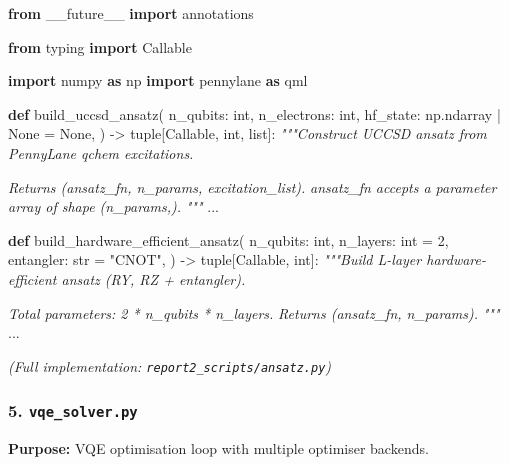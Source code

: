 \documentclass[
  11pt,
]{report}
\newenvironment{Shaded}{}{}
\newcommand{\BuiltInTok}[1]{\textcolor[rgb]{0.00,0.50,0.00}{#1}}
\newcommand{\CommentTok}[1]{\textcolor[rgb]{0.38,0.63,0.69}{\textit{#1}}}
\newcommand{\DecValTok}[1]{\textcolor[rgb]{0.25,0.63,0.44}{#1}}
\newcommand{\ImportTok}[1]{\textcolor[rgb]{0.00,0.50,0.00}{\textbf{#1}}}
\newcommand{\KeywordTok}[1]{\textcolor[rgb]{0.00,0.44,0.13}{\textbf{#1}}}
\newcommand{\NormalTok}[1]{#1}
\newcommand{\OperatorTok}[1]{\textcolor[rgb]{0.40,0.40,0.40}{#1}}
\newcommand{\StringTok}[1]{\textcolor[rgb]{0.25,0.44,0.63}{#1}}
\newcommand{\VariableTok}[1]{\textcolor[rgb]{0.10,0.09,0.49}{#1}}
\begin{document}
\begin{Shaded}
\begin{Highlighting}[]
\ImportTok{from}\NormalTok{ \_\_future\_\_ }\ImportTok{import}\NormalTok{ annotations}

\ImportTok{from}\NormalTok{ typing }\ImportTok{import}\NormalTok{ Callable}

\ImportTok{import}\NormalTok{ numpy }\ImportTok{as}\NormalTok{ np}
\ImportTok{import}\NormalTok{ pennylane }\ImportTok{as}\NormalTok{ qml}


\KeywordTok{def}\NormalTok{ build\_uccsd\_ansatz(}
\NormalTok{    n\_qubits: }\BuiltInTok{int}\NormalTok{,}
\NormalTok{    n\_electrons: }\BuiltInTok{int}\NormalTok{,}
\NormalTok{    hf\_state: np.ndarray }\OperatorTok{|} \VariableTok{None} \OperatorTok{=} \VariableTok{None}\NormalTok{,}
\NormalTok{) }\OperatorTok{{-}\textgreater{}} \BuiltInTok{tuple}\NormalTok{[Callable, }\BuiltInTok{int}\NormalTok{, }\BuiltInTok{list}\NormalTok{]:}
    \CommentTok{"""Construct UCCSD ansatz from PennyLane qchem excitations.}

\CommentTok{    Returns (ansatz\_fn, n\_params, excitation\_list).}
\CommentTok{    ansatz\_fn accepts a parameter array of shape (n\_params,).}
\CommentTok{    """}
\NormalTok{    ...}


\KeywordTok{def}\NormalTok{ build\_hardware\_efficient\_ansatz(}
\NormalTok{    n\_qubits: }\BuiltInTok{int}\NormalTok{,}
\NormalTok{    n\_layers: }\BuiltInTok{int} \OperatorTok{=} \DecValTok{2}\NormalTok{,}
\NormalTok{    entangler: }\BuiltInTok{str} \OperatorTok{=} \StringTok{"CNOT"}\NormalTok{,}
\NormalTok{) }\OperatorTok{{-}\textgreater{}} \BuiltInTok{tuple}\NormalTok{[Callable, }\BuiltInTok{int}\NormalTok{]:}
    \CommentTok{"""Build L{-}layer hardware{-}efficient ansatz (RY, RZ + entangler).}

\CommentTok{    Total parameters: 2 * n\_qubits * n\_layers.}
\CommentTok{    Returns (ansatz\_fn, n\_params).}
\CommentTok{    """}
\NormalTok{    ...}
\end{Highlighting}
\end{Shaded}

\emph{(Full implementation: \texttt{report2\_scripts/ansatz.py})}

\subsubsection{\texorpdfstring{5.
\texttt{vqe\_solver.py}}{5. vqe\_solver.py}}\label{vqe_solver.py}

\textbf{Purpose:} VQE optimisation loop with multiple optimiser
backends.
\end{document}
